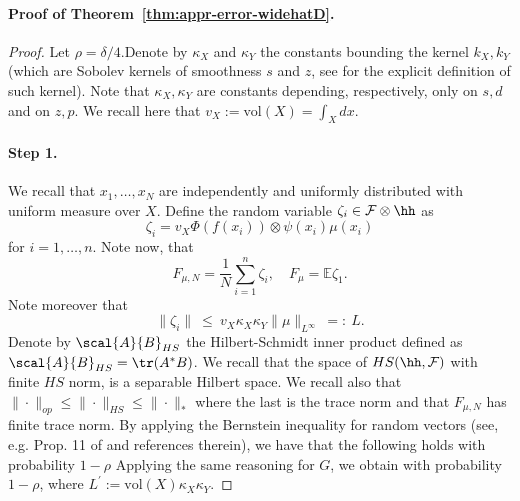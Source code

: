 \paragraph{Proof of Theorem~\ref{thm:appr-error-widehatD}.}
\begin{proof}
Let $\rho = \delta/4$.Denote by $\kappa_X$ and $\kappa_Y$ the constants bounding the kernel $k_X, k_Y$ (which are Sobolev kernels of smoothness $s$ and $z$, see \citet{wendland2004scattered} for the explicit definition of such kernel). Note that $\kappa_X, \kappa_Y$ are constants depending, respectively, only on $s, d$ and on $z, p$.
We recall here that $v_X := \textrm{vol}(X) = \int_X dx$.

\paragraph{Step 1. }
We recall that $x_1,\dots,x_N$ are independently and uniformly distributed with uniform measure over $X$.
Define the random variable $\zeta_i \in {\cal F} \otimes \hh$ as
$$\zeta_i = v_X \Phi(f(x_i)) \otimes \psi(x_i) \mu(x_i)$$
for $i=1,\dots,n$. Note now, that
$$F_{\mu, N} = \frac{1}{N} \sum_{i=1}^n \zeta_i, \quad F_\mu = \mathbb{E} \zeta_1.$$
Note moreover that
$$\|\zeta_i\| ~\leq~ v_X \kappa_X \kappa_Y \|\mu\|_{L^\infty} ~=:~ L.$$
Denote by $\scal{A}{B}_{HS}$ the Hilbert-Schmidt inner product defined as $\scal{A}{B}_{HS} = \tr(A^*B)$. We recall that the space of $HS(\hh,{\cal F})$ with finite $HS$ norm, is a separable Hilbert space. We recall also that $\|\cdot\|_{op} \leq \|\cdot\|_{HS} \leq \|\cdot\|_*$ where the last is the trace norm and that $F_{\mu, N}$ has finite trace norm.
By applying the Bernstein inequality for random vectors (see, e.g. Prop. 11 of \citet{rudi2015less} and references therein), we have that the following holds with probability $1-\rho$
Applying the same reasoning for $G$, we obtain
with probability $1-\rho$, where $L^\prime := \textrm{vol}(X)\kappa_X \kappa_Y.$


\end{proof}
